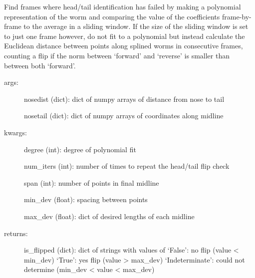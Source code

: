 \documentclass[letterpaper,10pt,openany,oneside]{sphinxmanual}
\begin{document}
\begin{fulllineitems}
\label{index:flipheadtail.main}
Find frames where head/tail identification has failed by making a 
polynomial representation of the worm and comparing the value of the 
coefficients frame-by-frame to the average in a sliding window. If the size of the sliding window is set to just one frame however, do not fit to a polynomial but instead calculate the Euclidean distance between points along splined worms in consecutive frames, counting a flip if the norm between `forward' and `reverse' is smaller than between both `forward'.
\begin{description}
\item[{args:}] \leavevmode
nosedist (dict): dict of numpy arrays of distance from nose to tail

nosetail (dict): dict of numpy arrays of coordinates along midline

\item[{kwargs:}] \leavevmode
degree (int): degree of polynomial fit

num\_iters (int): number of times to repeat the head/tail flip check

span (int): number of points in final midline

min\_dev (float): spacing between points

max\_dev (float): dict of desired lengths of each midline

\item[{returns:}] \leavevmode
is\_flipped (dict): dict of strings with values of 
`False': no flip (value \textless{} min\_dev)
`True': yes flip (value \textgreater{} max\_dev)
`Indeterminate': could not determine (min\_dev \textless{} value \textless{} max\_dev)

\end{description}

\end{fulllineitems}

\end{document}
